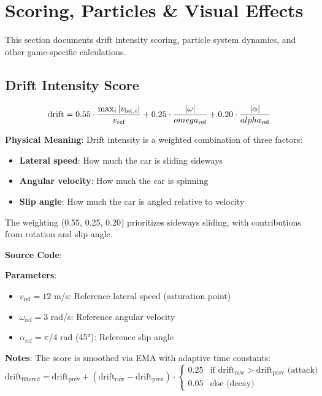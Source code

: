 \section{Scoring, Particles \& Visual Effects}

This section documents drift intensity scoring, particle system dynamics, and other game-specific calculations.

\subsection{Drift Intensity Score}

\begin{equation}
  \text{drift} = 0.55 \cdot \frac{\max_i|v_{\text{lat}, i}|}{v_{\text{ref}}} + 0.25 \cdot \frac{|\omega|}{\\omega_{\text{ref}}} + 0.20 \cdot \frac{|\alpha|}{\\alpha_{\text{ref}}}
  \label{eq:drift-intensity}
\end{equation}

\textbf{Physical Meaning}: Drift intensity is a weighted combination of three factors:
\begin{itemize}
  \item \textbf{Lateral speed}: How much the car is sliding sideways
  \item \textbf{Angular velocity}: How much the car is spinning
  \item \textbf{Slip angle}: How much the car is angled relative to velocity
\end{itemize}

The weighting (0.55, 0.25, 0.20) prioritizes sideways sliding, with contributions from rotation and slip angle.

\textbf{Source Code}: 

\textbf{Parameters}:
\begin{itemize}
  \item $v_{\text{ref}} = 12$ m/s: Reference lateral speed (saturation point)
  \item $\omega_{\text{ref}} = 3$ rad/s: Reference angular velocity
  \item $\alpha_{\text{ref}} = \pi/4$ rad (45°): Reference slip angle
\end{itemize}

\textbf{Notes}: The score is smoothed via EMA with adaptive time constants:
\begin{equation}
  \text{drift}_{\text{filtered}} = \text{drift}_{\text{prev}} + (\text{drift}_{\text{raw}} - \text{drift}_{\text{prev}}) \cdot \begin{cases}
    0.25 & \text{if } \text{drift}_{\text{raw}} > \text{drift}_{\text{prev}} \text{ (attack)} \\
    0.05 & \text{else (decay)}
  \end{cases}
\end{equation}


